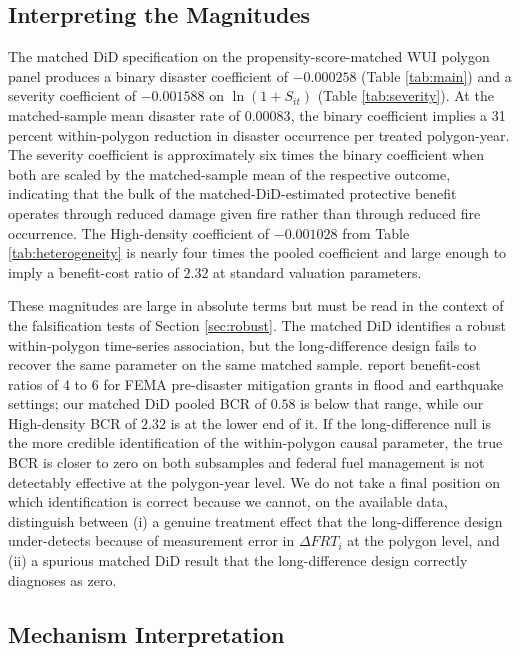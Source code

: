 \documentclass[12pt, letterpaper]{article}
\begin{document}
\subsection{Interpreting the Magnitudes}

The matched DiD specification on the propensity-score-matched WUI polygon panel produces a binary disaster coefficient of $-0.000258$ (Table \ref{tab:main}) and a severity coefficient of $-0.001588$ on $\ln(1 + S_{it})$ (Table \ref{tab:severity}). At the matched-sample mean disaster rate of $0.00083$, the binary coefficient implies a 31 percent within-polygon reduction in disaster occurrence per treated polygon-year. The severity coefficient is approximately six times the binary coefficient when both are scaled by the matched-sample mean of the respective outcome, indicating that the bulk of the matched-DiD-estimated protective benefit operates through reduced damage given fire rather than through reduced fire occurrence. The High-density coefficient of $-0.001028$ from Table \ref{tab:heterogeneity} is nearly four times the pooled coefficient and large enough to imply a benefit-cost ratio of $2.32$ at standard valuation parameters.

These magnitudes are large in absolute terms but must be read in the context of the falsification tests of Section \ref{sec:robust}. The matched DiD identifies a robust within-polygon time-series association, but the long-difference design fails to recover the same parameter on the same matched sample. \citet{rose2007} report benefit-cost ratios of 4 to 6 for FEMA pre-disaster mitigation grants in flood and earthquake settings; our matched DiD pooled BCR of $0.58$ is below that range, while our High-density BCR of $2.32$ is at the lower end of it. If the long-difference null is the more credible identification of the within-polygon causal parameter, the true BCR is closer to zero on both subsamples and federal fuel management is not detectably effective at the polygon-year level. We do not take a final position on which identification is correct because we cannot, on the available data, distinguish between (i) a genuine treatment effect that the long-difference design under-detects because of measurement error in $\Delta FRT_i$ at the polygon level, and (ii) a spurious matched DiD result that the long-difference design correctly diagnoses as zero.

\subsection{Mechanism Interpretation}
\end{document}
